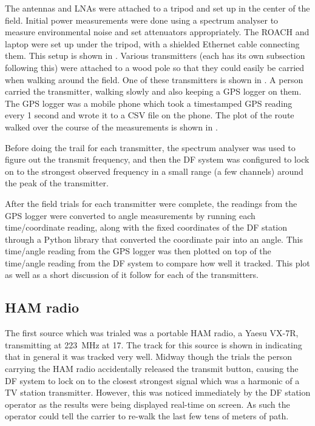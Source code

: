 The antennas and LNAs were attached to a tripod and set up in the center of the field. Initial power measurements were done using a spectrum analyser to measure environmental noise and set attenuators appropriately. The ROACH and laptop were set up under the tripod, with a shielded Ethernet cable connecting them. This setup is shown in . Various transmitters (each has its own subsection following this) were attached to a wood pole so that they could easily be carried when walking around the field. One of these transmitters is shown in . A person carried the transmitter, walking slowly and also keeping a GPS logger on them. The GPS logger was a mobile phone which took a timestamped GPS reading every 1 second and wrote it to a CSV file on the phone. The plot of the route walked over the course of the measurements is shown in .

Before doing the trail for each transmitter, the spectrum analyser was used to figure out the transmit frequency, and then the DF system was configured to lock on to the strongest observed frequency in a small range (a few channels) around the peak of the transmitter.

After the field trials for each transmitter were complete, the readings from the GPS logger were converted to angle measurements by running each time/coordinate reading, along with the fixed coordinates of the DF station through a Python library that converted the coordinate pair into an angle. This time/angle reading from the GPS logger was then plotted on top of the time/angle reading from the DF system to compare how well it tracked. This plot as well as a short discussion of it follow for each of the transmitters.


\subsection{HAM radio}
The first source which was trialed was a portable HAM radio, a Yaesu VX-7R, transmitting at \SI{223}{\mega\hertz} at \SI{17}{\dBm}. The track for this source is shown in  indicating that in general it was tracked very well. Midway though the trials the person carrying the HAM radio accidentally released the transmit button, causing the DF system to lock on to the closest strongest signal which was a harmonic of a TV station transmitter. However, this was noticed immediately by the DF station operator as the results were being displayed real-time on screen. As such the operator could tell the carrier to re-walk the last few tens of meters of path.

